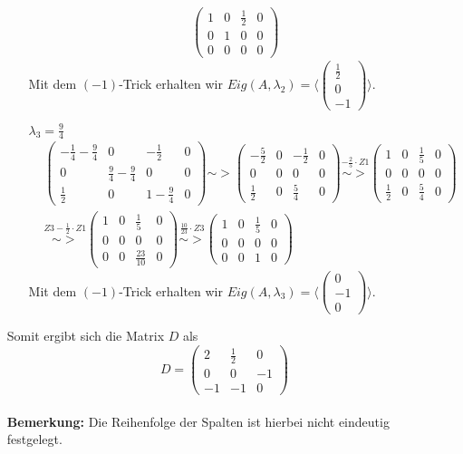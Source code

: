 \begin{itemize}
\begin{itemize}
\begin{align*}
\left(\begin{array}{ccc|c}
1 & 0 & \frac{1}{2} &0\\ 0 & 1 & 0 &0\\ 0 & 0 &0 &0
\end{array}\right)
\end{align*}
Mit dem $(-1)$-Trick erhalten wir $Eig(A,\lambda_2)=\langle \begin{pmatrix}\frac{1}{2} \\ 0\\ -1 \end{pmatrix}\rangle$.
%
\item[$\lambda_3=\frac{9}{4}$]
\begin{align*}
&\left(\begin{array}{ccc|c}
-\frac{1}{4} -\frac{9}{4}& 0 & -\frac{1}{2} &0\\ 0 & \frac{9}{4} -\frac{9}{4}& 0 &0\\ \frac{1}{2} & 0 &1-\frac{9}{4} &0
\end{array}\right){\sim >}
\left(\begin{array}{ccc|c}
-\frac{5}{2}& 0 & -\frac{1}{2} &0\\ 0 & 0& 0 &0\\ \frac{1}{2} & 0 &\frac{5}{4} &0
\end{array}\right)\stackrel{-\frac{2}{5}\cdot Z1}{\sim >}
\left(\begin{array}{ccc|c}
1& 0 & \frac{1}{5} &0\\ 0 & 0& 0 &0\\ \frac{1}{2} & 0 &\frac{5}{4} &0
\end{array}\right)\\
&\stackrel{Z3-\frac{1}{2}\cdot Z1}{\sim >}
\left(\begin{array}{ccc|c}
1& 0 & \frac{1}{5} &0\\ 0 & 0& 0 &0\\ 0 & 0 &\frac{23}{10} &0
\end{array}\right)\stackrel{\frac{10}{23}\cdot Z3}{\sim >}
\left(\begin{array}{ccc|c}
1& 0 & \frac{1}{5} &0\\ 0 & 0& 0 &0\\ 0 & 0 &1 &0
\end{array}\right)
\end{align*}
Mit dem $(-1)$-Trick erhalten wir $Eig(A,\lambda_3)=\langle \begin{pmatrix}0 \\ -1\\ 0 \end{pmatrix}\rangle$.
\end{itemize}
Somit ergibt sich die Matrix $D$ als
$$
D=\begin{pmatrix}2&\frac{1}{2}&0 \\0& 0&-1\\-1& -1&0 \end{pmatrix}
$$\quad\\
\textbf{Bemerkung:} Die Reihenfolge der Spalten ist hierbei nicht eindeutig festgelegt.
\end{itemize}

